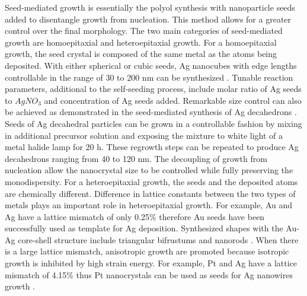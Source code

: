 Seed-mediated growth is essentially the polyol synthesis with nanoparticle seeds added to disentangle growth from nucleation.
This method allows for a greater control over the final morphology.
The two main categories of seed-mediated growth are homoepitaxial and heteroepitaxial growth.
For a homoepitaxial growth, the seed crystal is composed of the same metal as the atoms being deposited.
With either spherical or cubic seeds, Ag nanocubes with edge lengths controllable in the range of 30 to 200 nm can be synthesized \cite{Zhang_2010}.
Tunable reaction parameters, additional to the self-seeding process, include molar ratio of Ag seeds to $AgNO_3$ and concentration of Ag seeds added.
Remarkable size control can also be achieved as demonstrated in the seed-mediated synthesis of Ag decahedrons \cite{Pietrobon_2008}.
Seeds of Ag decahedral particles can be grown in a controllable fashion by mixing in additional precursor solution and exposing the mixture to white light of a metal halide lamp for 20 h.
These regrowth steps can be repeated to produce Ag decahedrons ranging from 40 to 120 nm.
The decoupling of growth from nucleation allow the nanocrystal size to be controlled while fully preserving the monodispersity.
For a heteroepitaxial growth, the seeds and the deposited atoms are chemically different.
Difference in lattice constants between the two types of metals plays an important role in heteroepitaxial growth.
For example, Au and Ag have a lattice mismatch of only 0.25\% therefore Au seeds have been successfully used as template for Ag deposition.
Synthesized shapes with the Au-Ag core-shell structure include triangular bifrustums \cite{Yoo_2009} and nanorods \cite{Seo_2008,Tsuji_2006}.
When there is a large lattice mismatch, anisotropic growth are promoted because isotropic growth is inhibited by high strain energy.
For example, Pt and Ag have a lattice mismatch of 4.15\% thus Pt nanocrystals can be used as seeds for Ag nanowires growth \cite{Sun_2002,Sun_2002b,Tsuji_2008b}.
